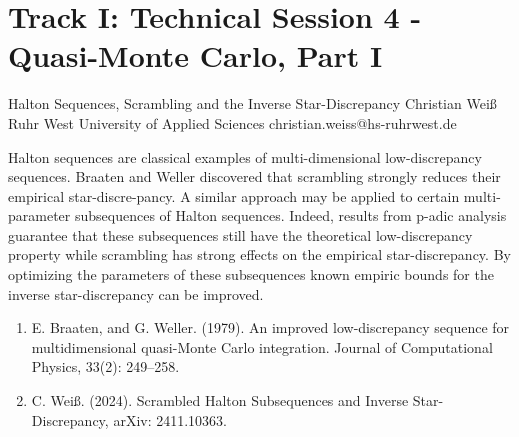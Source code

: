\section{Track I: Technical Session 4 - Quasi-Monte Carlo, Part I}\newpage

\begin{talk}
  {Halton Sequences, Scrambling and the Inverse Star-Discrepancy}%
  {Christian Wei\ss{}}%
  {Ruhr West University of Applied Sciences}%
  {christian.weiss@hs-ruhrwest.de}%
  {}%
  
    
   
Halton sequences are classical examples of multi-dimensional low-discrepancy sequences. Braaten and Weller discovered that scrambling strongly reduces their empirical star-discre-pancy. A similar approach may be applied to certain multi-parameter subsequences of Halton sequences. Indeed, results from p-adic analysis guarantee that these subsequences still have the theoretical low-discrepancy property while scrambling has strong effects on the empirical star-discrepancy. By optimizing the parameters of these subsequences known empiric bounds for the inverse star-discrepancy can be improved.

\medskip


\begin{enumerate}
 \item[{[1]}] E. Braaten, and G. Weller. (1979). An improved low-discrepancy sequence for multidimensional quasi-Monte Carlo integration. Journal of Computational Physics, 33(2): 249--258.
 \item[{[2]}] C. Wei\ss{}. (2024). Scrambled Halton Subsequences and Inverse Star-Discrepancy, arXiv: 2411.10363. 
\end{enumerate}

\end{talk}

